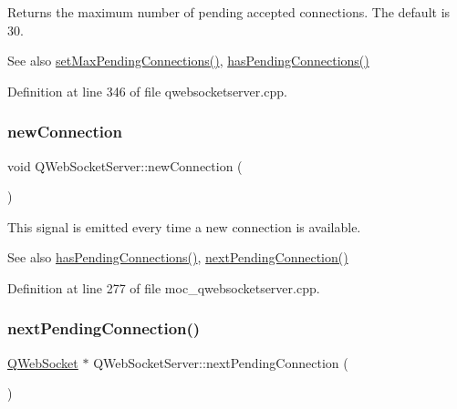 Returns the maximum number of pending accepted connections. The default is 30.

\begin{DoxySeeAlso}{See also}
\mbox{\hyperlink{class_q_web_socket_server_acc258d1094c0a0392c1e436bbff9c04a}{set\+Max\+Pending\+Connections()}}, \mbox{\hyperlink{class_q_web_socket_server_a90cd25d1e2fb4fdcc3cc7fdb4858db41}{has\+Pending\+Connections()}} 
\end{DoxySeeAlso}


Definition at line 346 of file qwebsocketserver.\+cpp.

\mbox{\label{class_q_web_socket_server_ae8023d4b4b3df6884e8fe363010fba85}} 
\subsubsection{\texorpdfstring{new\+Connection}{newConnection}}
{\footnotesize\ttfamily void Q\+Web\+Socket\+Server\+::new\+Connection (\begin{DoxyParamCaption}{ }\end{DoxyParamCaption})\hspace{0.3cm}{\ttfamily [signal]}}

This signal is emitted every time a new connection is available.

\begin{DoxySeeAlso}{See also}
\mbox{\hyperlink{class_q_web_socket_server_a90cd25d1e2fb4fdcc3cc7fdb4858db41}{has\+Pending\+Connections()}}, \mbox{\hyperlink{class_q_web_socket_server_ad2463f7d2f2576268d193186ee516c94}{next\+Pending\+Connection()}} 
\end{DoxySeeAlso}


Definition at line 277 of file moc\+\_\+qwebsocketserver.\+cpp.

\mbox{\label{class_q_web_socket_server_ad2463f7d2f2576268d193186ee516c94}} 
\subsubsection{\texorpdfstring{next\+Pending\+Connection()}{nextPendingConnection()}}
{\footnotesize\ttfamily \mbox{\hyperlink{class_q_web_socket}{Q\+Web\+Socket}} $\ast$ Q\+Web\+Socket\+Server\+::next\+Pending\+Connection (\begin{DoxyParamCaption}{ }\end{DoxyParamCaption})\hspace{0.3cm}{\ttfamily [virtual]}}

